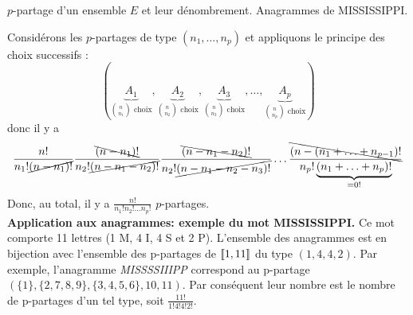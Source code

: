 \documentclass{article}
\renewenvironment{question_kholle}[2][ ]
{
	\subsection{\texorpdfstring{#2}{}}
	\notblank{#1}
	{
		\noindent #1
		\bigbreak
	}
	{}
	\begin{proof}
}
{
	\end{proof}
}
\begin{document}
\begin{question_kholle}
	[Soit $p \in \N^*$. Un $p$-partage de $E$ est un $p$-liste $(A_1, \ldots, A_p) \in \mathcal{P}(E)^p$ de parties de $E$ (éventuellement vide), deux à deux disjointes qui recouvrent $E$, i.e.
		\begin{equation*}
			\forall (i, j) \in \lient 1 ; p \rient,
			i \neq j \implies A_i \cap A_j = \emptyset
			\qquad \text{et} \qquad
			\bigcup_{i=1}^{p} A_i = E
		\end{equation*}
		Soient $(n_1, \ldots n_p) \in \N^p$ \tqs $n = n_1 + \cdots + n_p$. Un $p$-partage de $E$ de type $(n_{1},\dots,n_{p})$ est un $p$-partage $(A_{1},\dots,A_{p})$ de $E$ tel que
		\begin{equation*}
			\forall (i, j) \in \iset{1,p},|A_i| = n_i
		\end{equation*}
		Le nombre de $p$-partage de type $(n_1, \ldots, n_p)$ est :
		\begin{equation}
			\frac{n!}{\displaystyle \prod_{i=1}^{p} n_i !}
		\end{equation}
	]
	{$p$-partage d'un ensemble $E$ et leur dénombrement. Anagrammes de MISSISSIPPI.}

	Considérons les $p$-partages de type $(n_1, \ldots, n_p)$ et appliquons le principe des choix successifs :
	\begin{equation*}
		\left(
		\underbrace{A_1}_{\binom{n}{n_1} \text{ choix}},
		\underbrace{A_2}_{\binom{n}{n_2} \text{ choix}},
		\underbrace{A_3}_{\binom{n}{n_3} \text{ choix}},
		\ldots,
		\underbrace{A_p}_{\binom{n}{n_p} \text{ choix}}
		\right)
	\end{equation*}
	donc il y a
	\begin{equation*}
		\frac{ n! }{n_1! \cancel{(n-n_1)!} }
		\frac{ \bcancel{(n-n_1)!} }{n_2! \cancel{(n-n_1-n_2)!} }
		\frac{ \bcancel{(n-n_1-n_2)!} }{n_2! \cancel{(n-n_1-n_2-n_3)!} }
		\ldots
		\frac{ \bcancel{(n-(n_1+\ldots+n_{p-1})!} }{n_p! \underbrace{(n_1+\ldots+n_p)!}_{=0!} }
	\end{equation*}
	Donc, au total, il y a $\displaystyle\frac{n!}{n_1! n_2! \ldots n_p!}$ $p$-partages.\\

	\vspace{1em}\noindent\textbf{Application aux anagrammes: exemple du mot MISSISSIPPI.} Ce mot comporte 11 lettres (1 M, 4 I, 4 S et 2 P). L’ensemble des anagrammes est en bijection avec l’ensemble des p-partages de $[\![ 1,11 ]\!]$ du type $(1,4,4,2)$. Par exemple, l’anagramme \textit{MISSSSIIIPP} correspond au p-partage $(\{1\}, \{2,7,8,9\}, \{3,4,5,6\}, {10,11})$. Par conséquent leur nombre est le nombre de p-partages d’un tel type, soit $\displaystyle\frac{11!}{1!4!4!2!}$.
\end{question_kholle}
\end{document}
